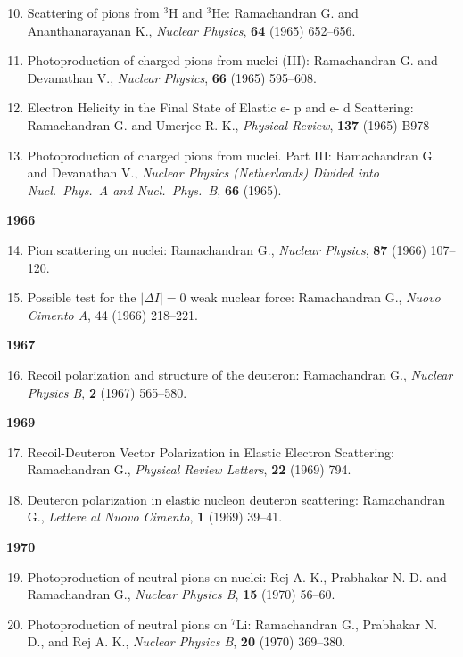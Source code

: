 \begin{enumerate}
\setcounter{enumi}{9}
\item Scattering of pions from $^{3}$H and $^{3}$He: Ramachandran G. and Ananthanarayanan K., \textit{Nuclear Physics}, {\bf 64} (1965) 652--656.
\item Photoproduction of charged pions from nuclei (III): Ramachandran G. and Devanathan V., \textit{Nuclear Physics}, {\bf 66} (1965) 595--608.
\item Electron Helicity in the Final State of Elastic e- p and e- d Scattering: Ramachandran G. and Umerjee R. K., \textit{Physical Review}, {\bf 137} (1965) B978
\item Photoproduction of charged pions from nuclei. Part III: Rama\-chandran G. and Devanathan V., \textit{Nuclear Physics (Netherlands) Divided into Nucl.\  Phys.\ A and Nucl.\ Phys.\ B}, {\bf 66} (1965).
\end{enumerate}
\textbf{1966}
\begin{enumerate}
\setcounter{enumi}{13}
\item Pion scattering on nuclei: Ramachandran G., \textit{Nuclear Physics}, {\bf 87} (1966) 107--120.
\item Possible test for the $|\Delta I|=0$ weak nuclear force: Ramachandran G., \textit{Nuovo Cimento A}, 44 (1966) 218--221.
\end{enumerate}
\textbf{1967}
\begin{enumerate}
\setcounter{enumi}{15}
\item Recoil polarization and structure of the deuteron: Ramachandran G., \textit{Nuclear Physics B}, {\bf 2} (1967) 565--580.
\end{enumerate}
\textbf{1969}
\begin{enumerate}
\setcounter{enumi}{16}
\item Recoil-Deuteron Vector Polarization in Elastic Electron Scattering: Ramachandran G., \textit{Physical Review Letters}, {\bf 22} (1969) 794.
\item Deuteron polarization in elastic nucleon deuteron scattering: Ramachandran G., \textit{Lettere al Nuovo Cimento}, {\bf 1} (1969) 39--41.
\end{enumerate}
\textbf{1970}
\begin{enumerate}
\setcounter{enumi}{18}
\item Photoproduction of neutral pions on nuclei: Rej A. K., Prabhakar N. D. and Ramachandran G., \textit{Nuclear Physics B}, {\bf 15} (1970) 56--60.
\item Photoproduction of neutral pions on $^{7}$Li: Ramachandran G., Prabhakar N. D., and Rej A. K., \textit{Nuclear Physics B}, {\bf 20} (1970) 369--380.
\end{enumerate}
